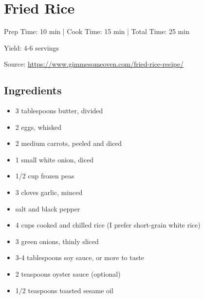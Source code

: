 \section{Fried Rice}

\begin{center}
Prep Time: 10 min |
Cook Time: 15 min |
Total Time: 25 min

\noindent Yield: 4-6 servings

\vspace{1em}

    Source: \url{https://www.gimmesomeoven.com/fried-rice-recipe/}
\end{center}

\subsection{Ingredients}
\begin{multicols}{2}
\begin{itemize}
  \item 3 tablespoons butter, divided
  \item 2 eggs, whisked
  \item 2 medium carrots, peeled and diced
  \item 1 small white onion, diced
  \item 1/2 cup frozen peas
  \item 3 cloves garlic, minced
  \item salt and black pepper
  \item 4 cups cooked and chilled rice (I prefer short-grain white rice)
  \item 3 green onions, thinly sliced
  \item 3-4 tablespoons soy sauce, or more to taste
  \item 2 teaspoons oyster sauce (optional)
  \item 1/2 teaspoons toasted sesame oil
\end{itemize}
\end{multicols}

